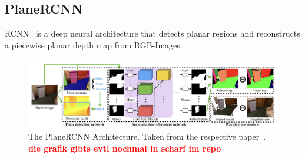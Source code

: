 \documentclass[main.tex]{subfiles}
\begin{document}
\subsection{PlaneRCNN}
RCNN~\cite{Liu_Kim_Gu_Furukawa_Kautz_2019} is a deep neural architecture that detects planar
regions and reconstructs a piecewise planar depth map from RGB-Images.

\begin{figure}[H]
    \centering
    \includegraphics[width=\textwidth]{images/planercnn.png}
    \caption[PlaneRCNN Architecture]{The PlaneRCNN Architecture. Taken from the respective paper~\cite{Liu_Kim_Gu_Furukawa_Kautz_2019}.
        \textbf{\textcolor{red}{die grafik gibts evtl nochmal in scharf im repo}}}
\end{figure}
\end{document}
